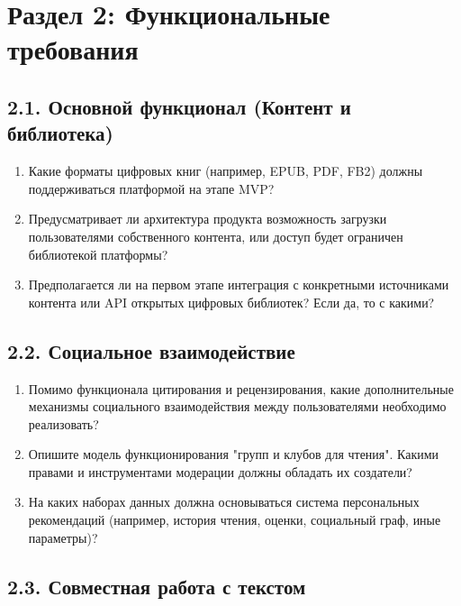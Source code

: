 \documentclass[12pt,a4paper]{article}
\begin{document}
\vspace{1cm}

\section*{Раздел 2: Функциональные требования}

\subsection*{2.1. Основной функционал (Контент и библиотека)}

\begin{enumerate}[resume]
    \item Какие форматы цифровых книг (например, EPUB, PDF, FB2) должны поддерживаться платформой на этапе MVP?
    
    \item Предусматривает ли архитектура продукта возможность загрузки пользователями собственного контента, или доступ будет ограничен библиотекой платформы?
    
    \item Предполагается ли на первом этапе интеграция с конкретными источниками контента или API открытых цифровых библиотек? Если да, то с какими?
\end{enumerate}

\subsection*{2.2. Социальное взаимодействие}

\begin{enumerate}[resume]
    \item Помимо функционала цитирования и рецензирования, какие дополнительные механизмы социального взаимодействия между пользователями необходимо реализовать?
    
    \item Опишите модель функционирования "групп и клубов для чтения". Какими правами и инструментами модерации должны обладать их создатели?
    
    \item На каких наборах данных должна основываться система персональных рекомендаций (например, история чтения, оценки, социальный граф, иные параметры)?
\end{enumerate}

\subsection*{2.3. Совместная работа с текстом}
\end{document}
